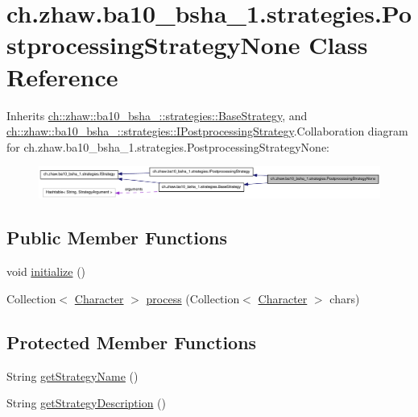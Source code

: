 \hypertarget{classch_1_1zhaw_1_1ba10__bsha__1_1_1strategies_1_1PostprocessingStrategyNone}{
\section{ch.zhaw.ba10\_\-bsha\_\-1.strategies.PostprocessingStrategyNone Class Reference}
\label{classch_1_1zhaw_1_1ba10__bsha__1_1_1strategies_1_1PostprocessingStrategyNone}
}


Inherits \hyperlink{classch_1_1zhaw_1_1ba10__bsha__1_1_1strategies_1_1BaseStrategy}{ch::zhaw::ba10\_\-bsha\_::strategies::BaseStrategy}, and \hyperlink{interfacech_1_1zhaw_1_1ba10__bsha__1_1_1strategies_1_1IPostprocessingStrategy}{ch::zhaw::ba10\_\-bsha\_::strategies::IPostprocessingStrategy}.Collaboration diagram for ch.zhaw.ba10\_\-bsha\_\-1.strategies.PostprocessingStrategyNone:\nopagebreak
\begin{figure}[H]
\begin{center}
\leavevmode
\includegraphics[width=400pt]{classch_1_1zhaw_1_1ba10__bsha__1_1_1strategies_1_1PostprocessingStrategyNone__coll__graph}
\end{center}
\end{figure}
\subsection*{Public Member Functions}
\begin{DoxyCompactItemize}
\item 
void \hyperlink{classch_1_1zhaw_1_1ba10__bsha__1_1_1strategies_1_1PostprocessingStrategyNone_afb92557a36f60e5b88cce17eddc688d9}{initialize} ()
\item 
Collection$<$ \hyperlink{classch_1_1zhaw_1_1ba10__bsha__1_1_1Character}{Character} $>$ \hyperlink{classch_1_1zhaw_1_1ba10__bsha__1_1_1strategies_1_1PostprocessingStrategyNone_af9183ec4f0802402cde7f97f746c7874}{process} (Collection$<$ \hyperlink{classch_1_1zhaw_1_1ba10__bsha__1_1_1Character}{Character} $>$ chars)
\end{DoxyCompactItemize}
\subsection*{Protected Member Functions}
\begin{DoxyCompactItemize}
\item 
String \hyperlink{classch_1_1zhaw_1_1ba10__bsha__1_1_1strategies_1_1PostprocessingStrategyNone_a6c5447b46c9ddb6add9d5f3f21ac7721}{getStrategyName} ()
\item 
String \hyperlink{classch_1_1zhaw_1_1ba10__bsha__1_1_1strategies_1_1PostprocessingStrategyNone_aa6732900e4c07b57f238da6134c8405a}{getStrategyDescription} ()
\end{DoxyCompactItemize}


